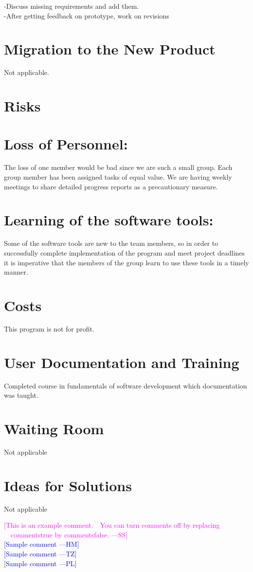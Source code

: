 \documentclass[12pt]{article}
\newcommand{\authornote}[3]{\textcolor{#1}{[#3 ---#2]}}
\newcommand{\authornote}[3]{}
\newcommand{\wss}[1]{\authornote{magenta}{SS}{#1}}
\newcommand{\hm}[1]{\authornote{blue}{HM}{#1}} %
\newcommand{\tz}[1]{\authornote{blue}{TZ}{#1}} %
\newcommand{\pl}[1]{\authornote{blue}{PL}{#1}} %
\begin{document}
-Discuss missing requirements and add them.\\

-After getting feedback on prototype, work on revisions

\section*{Migration to the New Product }
Not applicable.

\section*{Risks }

\section*{Loss of Personnel: }The loss of one member would be bad since we are such a small group. Each group member has been assigned tasks of equal value. We are having weekly meetings to share detailed progress reports as a precautionary measure. 

\section*{Learning of the software tools:} Some of the software tools are new to the team members, so in order to successfully complete implementation of the program and meet project deadlines it is imperative that the members of the group learn to use these tools in a timely manner.

\section*{Costs }
This program is not for profit.

\section*{User Documentation and Training }
Completed course in fundamentals of software development which documentation was taught.

\section*{Waiting Room}
Not applicable 

\section*{Ideas for Solutions}
Not applicable






\noindent \wss{This is an example comment.  You can turn comments off by replacing
  commentstrue by commentsfalse.}\\
\hm{Sample comment}\\
\tz{Sample comment}\\
\pl{Sample comment}
\end{document}
